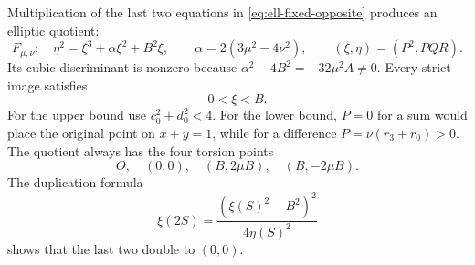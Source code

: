 Multiplication of the last two equations in
\eqref{eq:ell-fixed-opposite} produces an elliptic quotient:
\begin{equation}\label{eq:ell-fixed-elliptic}
 F_{\mu,\nu}:\quad
 \eta^2=\xi^3+\alpha\xi^2+B^2\xi,
 \qquad \alpha=2(3\mu^2-4\nu^2),
 \qquad (\xi,\eta)=(P^2,PQR).
\end{equation}
Its cubic discriminant is nonzero because
$\alpha^2-4B^2=-32\mu^2A\ne0$.
Every strict image satisfies
\begin{equation}\label{eq:ell-quotient-interval}
 0<\xi<B.
\end{equation}
For the upper bound use $c_0^2+d_0^2<4$.
For the lower bound, $P=0$ for a sum would place the original point
on $x+y=1$, while for a difference $P=\nu(r_3+r_0)>0$.
The quotient always has the four torsion points
\begin{equation}\label{eq:ell-order-four}
 O,\quad(0,0),\quad(B,2\mu B),\quad(B,-2\mu B).
\end{equation}
The duplication formula
\begin{equation}\label{eq:ell-duplication}
 \xi(2S)=\frac{(\xi(S)^2-B^2)^2}{4\eta(S)^2}
\end{equation}
shows that the last two double to $(0,0)$.

